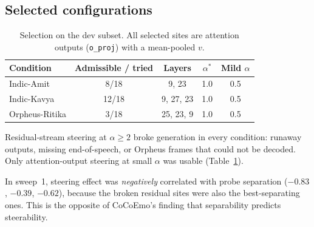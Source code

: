 \documentclass[11pt]{article}
\newcommand{\astar}{\alpha^{*}}
\begin{document}
\subsection{Selected configurations}
\begin{table}[h]
\centering
\caption{Selection on the dev subset. All selected sites are attention outputs (\texttt{o\_proj}) with a mean-pooled $v$.}
\label{tab:sel}
\begin{tabular}{lcccc}
\toprule
Condition & Admissible / tried & Layers & $\astar$ & Mild $\alpha$ \\
\midrule
Indic-Amit & 8/18 & 9, 23 & 1.0 & 0.5 \\
Indic-Kavya & 12/18 & 9, 27, 23 & 1.0 & 0.5 \\
Orpheus-Ritika & 3/18 & 25, 23, 9 & 1.0 & 0.5 \\
\bottomrule
\end{tabular}
\end{table}

Residual-stream steering at $\alpha\ge2$ broke generation in every condition: runaway outputs, missing end-of-speech, or Orpheus frames that could not be decoded. Only attention-output steering at small $\alpha$ was usable (Table~\ref{tab:sel}).

In sweep~1, steering effect was \emph{negatively} correlated with probe separation ($-0.83$, $-0.39$, $-0.62$), because the broken residual sites were also the best-separating ones. This is the opposite of CoCoEmo's finding that separability predicts steerability.
\end{document}
